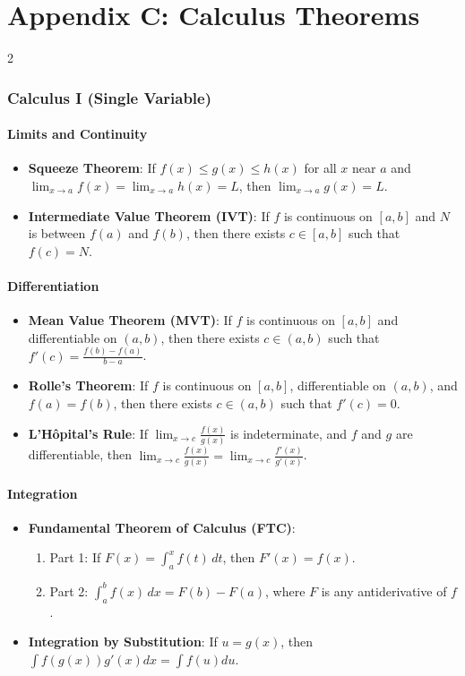 \newpage

\chapter*{Appendix C: Calculus Theorems}


\begin{multicols}{2}

\subsection*{Calculus I (Single Variable)}
\subsubsection*{Limits and Continuity}
\begin{itemize}
\item \textbf{Squeeze Theorem}: If $f(x) \leq g(x) \leq h(x)$ for all $x$ near $a$ and $\lim_{x \to a} f(x) = \lim_{x \to a} h(x) = L$, then $\lim_{x \to a} g(x) = L$.
\item \textbf{Intermediate Value Theorem (IVT)}: If $f$ is continuous on $[a, b]$ and $N$ is between $f(a)$ and $f(b)$, then there exists $c \in [a, b]$ such that $f(c) = N$.
\end{itemize}

\subsubsection*{Differentiation}
\begin{itemize}
\item \textbf{Mean Value Theorem (MVT)}: If $f$ is continuous on $[a, b]$ and differentiable on $(a, b)$, then there exists $c \in (a, b)$ such that $f'(c) = \frac{f(b) - f(a)}{b - a}$.
\item \textbf{Rolle's Theorem}: If $f$ is continuous on $[a, b]$, differentiable on $(a, b)$, and $f(a) = f(b)$, then there exists $c \in (a, b)$ such that $f'(c) = 0$.
\item \textbf{L'Hôpital's Rule}: If $\lim_{x \to c} \frac{f(x)}{g(x)}$ is indeterminate, and $f$ and $g$ are differentiable, then $\lim_{x \to c} \frac{f(x)}{g(x)} = \lim_{x \to c} \frac{f'(x)}{g'(x)}$.
\end{itemize}

\subsubsection*{Integration}
\begin{itemize}
\item \textbf{Fundamental Theorem of Calculus (FTC)}:
\begin{enumerate}
\item Part 1: If $F(x) = \int_a^x f(t) \, dt$, then $F'(x) = f(x)$.
\item Part 2: $\int_a^b f(x) \, dx = F(b) - F(a)$, where $F$ is any antiderivative of $f$.
\end{enumerate}
\item \textbf{Integration by Substitution}: If $u = g(x)$, then $\int f(g(x))g'(x)dx = \int f(u)du$.
\end{itemize}


\end{multicols}
